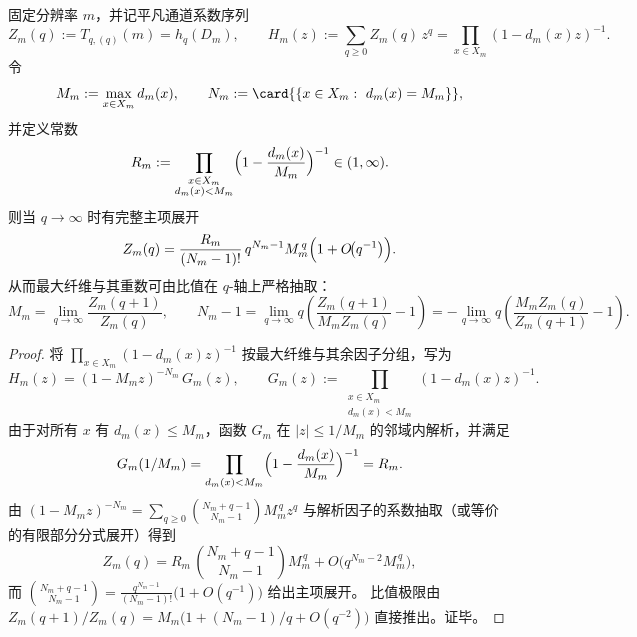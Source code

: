 \begin{theorem}\label{thm:pom-trivial-channel-extreme-spectrum-extraction}
固定分辨率 \(m\)，并记平凡通道系数序列
\[
Z_m(q):=T_{q,(q)}(m)=h_q(D_m),
\qquad
H_m(z):=\sum_{q\ge 0}Z_m(q)\,z^q=\prod_{x\in X_m}(1-d_m(x)z)^{-1}.
\]
令
\[
M_m:=\max_{x\in X_m}d_m(x),\qquad
N_m:=\card{\{x\in X_m:\ d_m(x)=M_m\}},
\]
并定义常数
\[
R_m:=\prod_{\substack{x\in X_m\\ d_m(x)<M_m}}\Bigl(1-\frac{d_m(x)}{M_m}\Bigr)^{-1}\in(1,\infty).
\]
则当 \(q\to\infty\) 时有完整主项展开
\[
Z_m(q)=\frac{R_m}{(N_m-1)!}\,q^{N_m-1}M_m^{\,q}\Bigl(1+O\!\bigl(q^{-1}\bigr)\Bigr).
\]
从而最大纤维与其重数可由比值在 \(q\)-轴上严格抽取：
\[
M_m=\lim_{q\to\infty}\frac{Z_m(q+1)}{Z_m(q)},
\qquad
N_m-1=\lim_{q\to\infty}q\left(\frac{Z_m(q+1)}{M_m Z_m(q)}-1\right)
=-\lim_{q\to\infty}q\left(\frac{M_m Z_m(q)}{Z_m(q+1)}-1\right).
\]
\end{theorem}
\begin{proof}
将
\(
\prod_{x\in X_m}(1-d_m(x)z)^{-1}
\)
按最大纤维与其余因子分组，写为
\[
H_m(z)=(1-M_m z)^{-N_m}\,G_m(z),
\qquad
G_m(z):=\prod_{\substack{x\in X_m\\ d_m(x)<M_m}}(1-d_m(x)z)^{-1}.
\]
由于对所有 \(x\) 有 \(d_m(x)\le M_m\)，函数 \(G_m\) 在 \(|z|\le 1/M_m\) 的邻域内解析，并满足
\[
G_m(1/M_m)=\prod_{d_m(x)<M_m}\Bigl(1-\frac{d_m(x)}{M_m}\Bigr)^{-1}=R_m.
\]
由 \((1-M_m z)^{-N_m}=\sum_{q\ge 0}\binom{N_m+q-1}{N_m-1}M_m^{\,q}z^q\) 与解析因子的系数抽取（或等价的有限部分分式展开）得到
\[
Z_m(q)=R_m\,\binom{N_m+q-1}{N_m-1}M_m^{\,q}+O\!\bigl(q^{N_m-2}M_m^{\,q}\bigr),
\]
而
\(
\binom{N_m+q-1}{N_m-1}=\frac{q^{N_m-1}}{(N_m-1)!}\bigl(1+O(q^{-1})\bigr)
\)
给出主项展开。
比值极限由
\(
Z_m(q+1)/Z_m(q)=M_m\bigl(1+(N_m-1)/q+O(q^{-2})\bigr)
\)
直接推出。证毕。
\end{proof}

